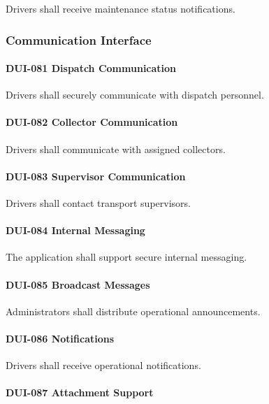 Drivers shall receive maintenance status notifications.


\subsubsection*{Communication Interface}

\paragraph{DUI-081 Dispatch Communication}

Drivers shall securely communicate with dispatch personnel.

\paragraph{DUI-082 Collector Communication}

Drivers shall communicate with assigned collectors.

\paragraph{DUI-083 Supervisor Communication}

Drivers shall contact transport supervisors.

\paragraph{DUI-084 Internal Messaging}

The application shall support secure internal messaging.

\paragraph{DUI-085 Broadcast Messages}

Administrators shall distribute operational announcements.

\paragraph{DUI-086 Notifications}

Drivers shall receive operational notifications.

\paragraph{DUI-087 Attachment Support}

